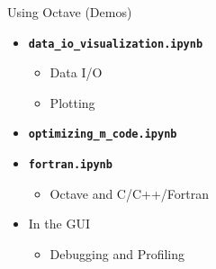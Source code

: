\begin{frame}{Using Octave (Demos)}
\begin{itemize}
\itemsep2em
\item
\textbf{\color{DarkBlue}\texttt{data\_io\_visualization.ipynb}}
\begin{itemize}
\item
Data I/O
\item
Plotting
\end{itemize}

\item
\textbf{\color{DarkBlue}\texttt{optimizing\_m\_code.ipynb}}

\item
\textbf{\color{DarkBlue}\texttt{fortran.ipynb}}
\begin{itemize}
\item
Octave and C/C++/Fortran
\end{itemize}

\item
In the GUI
\begin{itemize}
\item
Debugging and Profiling
\end{itemize}
\end{itemize}
\end{frame}
